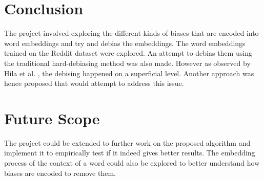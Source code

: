 \documentclass[12pt, a4paper]{article}
\begin{document}
			
	\section{Conclusion}
		The project involved exploring the different kinds of biases that are encoded into word embeddings and try and debias the embeddings. The word embeddings trained on the Reddit dataset were explored. An attempt to debias them using the traditional hard-debiasing method was also made. However as observed by Hila et al. \cite{1}, the debising happened on a superficial level. Another approach was hence proposed that would attempt to address this issue.
		
	\section{Future Scope}
		The project could be extended to further work on the proposed algorithm and implement it to empirically test if it indeed gives better results. The embedding process of the context of a word could also be explored to better understand how biases are encoded to remove them.
		
\end{document}
